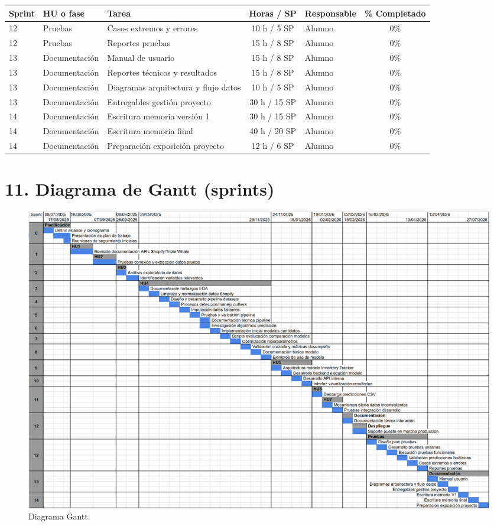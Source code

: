 \documentclass[
11pt, %
]{charter}
\begin{document}
\begin{table}[htpb]
\centering
\begin{tabularx}{\linewidth}{@{}|l|l|X|c|l|c|@{}}
\hline
\rowcolor[HTML]{C0C0C0}
Sprint & HU o fase & Tarea & Horas / SP & Responsable & \% Completado \\ \hline
12 & Pruebas & Casos extremos y errores & 10 h / 5 SP & Alumno & 0\% \\ \hline
12 & Pruebas & Reportes pruebas & 15 h / 8 SP & Alumno & 0\% \\ \hline
13 & Documentación & Manual de usuario & 15 h / 8 SP & Alumno & 0\% \\ \hline
13 & Documentación & Reportes técnicos y resultados & 15 h / 8 SP & Alumno & 0\% \\ \hline
13 & Documentación & Diagramas arquitectura y flujo datos & 10 h / 5 SP & Alumno & 0\% \\ \hline
13 & Documentación & Entregables gestión proyecto & 30 h / 15 SP & Alumno & 0\% \\ \hline
14 & Documentación & Escritura memoria versión 1 & 30 h / 15 SP & Alumno & 0\% \\ \hline
14 & Documentación & Escritura memoria final & 40 h / 20 SP & Alumno & 0\% \\ \hline
14 & Documentación & Preparación exposición proyecto & 12 h / 6 SP & Alumno & 0\% \\ \hline
\end{tabularx}
\end{table}

\section{11. Diagrama de Gantt (sprints)}
\label{sec:gantt}

\begin{figure}[htpb]
\centering 
\includegraphics[width=1\textwidth]{./Figuras/Gantt-2.png}
\caption{Diagrama Gantt.}

\end{figure}
\end{document}

